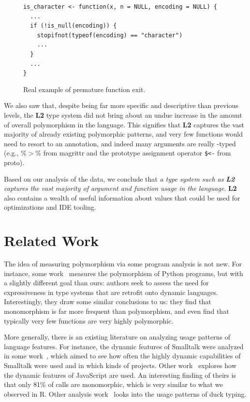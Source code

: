 \documentclass[acmsmall,10pt,review,anonymous]{acmart}\settopmatter{printfolios=true,printccs=false,printacmref=false}
\begin{document}
\begin{figure}[!hb]{\small\begin{lstlisting}[style=R]
is_character <- function(x, n = NULL, encoding = NULL) {
  ...
  if (!is_null(encoding)) {
    stopifnot(typeof(encoding) == "character")
    ...
  }
  ...
}
\end{lstlisting}}\caption{Real example of premature function exit.}\label{fig:stopifnot}\end{figure}

We also saw that, despite being far more specific and descriptive than previous levels, the {\bf L2} type system did not bring about an undue increase in the amount of overall polymorphism in the language.
This signifies that {\bf L2} captures the vast majority of already existing polymorphic patterns, and very few functions would need to resort to an \ANY annotation, and indeed many arguments are really \ANY-typed (e.g., \%$>$\% from magrittr and the prototype assignment operator {\tt \$<-} from proto).

Based on our analysis of the data, we conclude that {\it a type system such as} \textbf{\emph{L2}} {\it captures the vast majority of argument and function usage in the language}.
{\bf L2} also contains a wealth of useful information about values that could be used for optimizations and IDE tooling.



%
%
%
%
%

%
%
%
%
\section{Related Work}

The idea of measuring polymorphism via some program analysis is not new.
For instance, some work~\cite{aakerblom2015measuring} measures the polymorphism of Python programs, but with a slightly different goal than ours: authors seek to assess the need for expressiveness in type systems that are retrofit onto dynamic languages.
Interestingly, they draw some similar conclusions to us: they find that monomorphism is far more frequent than polymorphism, and even find that typically very few functions are very highly polymorphic.

More generally, there is an existing literature on analyzing usage patterns of language features.  
For instance, the dynamic features of Smalltalk were analyzed in some work~\cite{callau2011howdevelopers}, which aimed to see how often the highly dynamic capabilities of Smalltalk were used and in which kinds of projects.
Other work~\cite{pldi10a} explores how the dynamic features of JavaScript are used.
An interesting finding of theirs is that only 81\% of calls are monomorphic, which is very similar to what we observed in R.
Other analysis work~\cite{milojkovic2017duck} looks into the usage patterns of duck typing.
\end{document}
